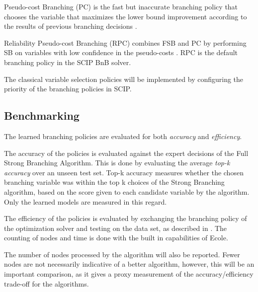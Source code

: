 Pseudo-cost Branching (\gls{PC}) is the fast but inaccurate branching policy \cite{gamrath2018measuring} that chooses the variable that maximizes the lower bound improvement according to the results of previous branching decisions \cite{benchiou1971experiments}.%

Reliability Pseudo-cost Branching (\gls{RPC}) \cite{achterberg2004branching} combines \gls{FSB} and \gls{PC} by performing \gls{SB} on variables with low confidence in the pseudo-costs \cite{gamrath2018measuring}. \gls{RPC} is the default branching policy in the \gls{SCIP} \gls{BnB} solver. 

The classical variable selection policies will be implemented by configuring the priority of the branching policies in \gls{SCIP}. 


\subsection{Benchmarking}\label{ssec:benchmarking}

The learned branching policies are evaluated for both \textit{accuracy} and \textit{efficiency}. 

The accuracy of the policies is evaluated against the expert decisions of the Full Strong Branching Algorithm. This is done by evaluating the average \textit{top-k accuracy} over an unseen test set. Top-k accuracy measures whether the chosen branching variable was within the top k choices of the Strong Branching algorithm, based on the score given to each candidate variable by the algorithm. Only the learned models are measured in this regard. 

The efficiency of the policies is evaluated by exchanging the branching policy of the optimization solver and testing on the data set, as described in . The counting of nodes and time is done with the built in capabilities of \gls{Ecole}. %

The number of nodes processed by the algorithm will also be reported. Fewer nodes are not necessarily indicative of a better algorithm, however, this will be an important comparison, as it gives a proxy measurement of the accuracy/efficiency trade-off for the algorithms. 





